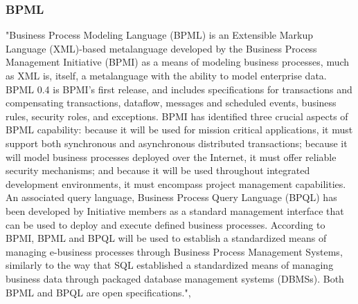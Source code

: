 \documentclass[12pt]{article}
\begin{document}
\subsubsection{BPML} %
"Business Process Modeling Language (BPML) is an Extensible Markup Language (XML)-based metalanguage developed by the Business Process Management Initiative (BPMI) as a means of modeling business processes, much as XML is, itself, a metalanguage with the ability to model enterprise data. BPML 0.4 is BPMI's first release, and includes specifications for transactions and compensating transactions, dataflow, messages and scheduled events, business rules, security roles, and exceptions. BPMI has identified three crucial aspects of BPML capability: because it will be used for mission critical applications, it must support both synchronous and asynchronous distributed transactions; because it will model business processes deployed over the Internet, it must offer reliable security mechanisms; and because it will be used throughout integrated development environments, it must encompass project management capabilities.\\ An associated query language, Business Process Query Language (BPQL) has been developed by Initiative members as a standard management interface that can be used to deploy and execute defined business processes. According to BPMI, BPML and BPQL will be used to establish a standardized means of managing e-business processes through Business Process Management Systems, similarly to the way that SQL established a standardized means of managing business data through packaged database management systems (DBMSs). Both BPML and BPQL are open specifications.", \cite{bpmldefmr}
\end{document}
